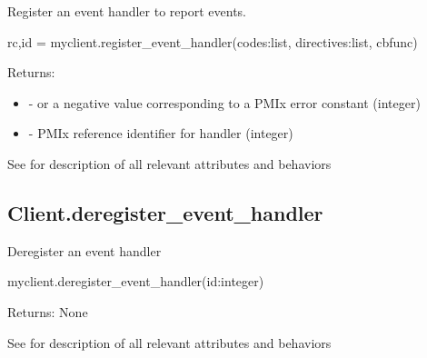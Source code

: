 \summary

Register an event handler to report events.

\format

\pyspecificstart
\begin{codepar}
rc,id = myclient.register_event_handler(codes:list, directives:list, cbfunc)
\end{codepar}
\pyspecificend

\begin{arglist}
\end{arglist}

Returns:

\begin{itemize}
    \item {} -  or a negative value corresponding to a PMIx error constant (integer)
    \item {} - \ac{PMIx} reference identifier for handler (integer)
\end{itemize}


See  for description of all relevant attributes and behaviors


\subsection{Client.deregister_event_handler}

\summary

Deregister an event handler

\format

\pyspecificstart
\begin{codepar}
myclient.deregister_event_handler(id:integer)
\end{codepar}
\pyspecificend

\begin{arglist}
\end{arglist}

Returns: None

See  for description of all relevant attributes and behaviors


